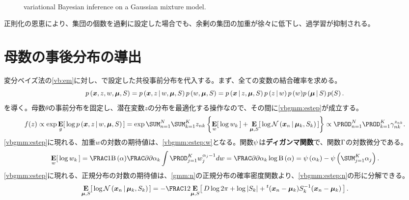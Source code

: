 \documentclass[10pt,a4paper]{book}
\begin{document}
\begin{figure}[h]
\centering
{}
\caption{variational Bayesian inference on a Gaussian mixture model.\label{fig:vb}}
\end{figure}

正則化の恩恵により、集団の個数を過剰に設定した場合でも、余剰の集団の加重が徐々に低下し、過学習が抑制される。

\section{母数の事後分布の導出}

変分ベイズ法の\eqref{vb:em}に対し、で設定した共役事前分布を代入する。まず、全ての変数の結合確率を求める。
%
\begin{equation}
\prob{\bm{x},z,w,\bm{\mu},S} =
\prob{\bm{x},z}[w,\bm{\mu},S] \prob{w,\bm{\mu},S} =
\prob{\bm{x}}[z,\bm{\mu},S] \prob{z}[w] \prob{w) \prob{\bm{\mu}}[S] p(S}.
\end{equation}
%
\Estep{}を導く。母数$\theta$の事前分布を固定し、潜在変数$z$の分布を最適化する操作なので、その間に\eqref{vbgmm:estep}が成立する。
%
\begin{equation}
\label{eq:vbgmm:estep}
f(z) \propto
\exp \E[g]{\log \prob{\bm{x},z}[w,\bm{\mu},S]} =
\exp \sum_{n=1}^N \sum_{k=1}^K z_{nk} \seq{\E[w]{\log w_k} + \E[\bm{\mu},S]{\log \Nd{\bm{x}_n}{\bm{\mu}_k,S_k}}} \propto
\prod_{n=1}^N \prod_{k=1}^K \gamma_{nk}^{z_{nk}}.
\end{equation}
%
\eqref{vbgmm:estep}に現れる、加重$w$の対数の期待値は、\eqref{vbgmm:estep:w}となる。関数$\psi$は\textbf{ディガンマ関数}で、関数$\Gamma$の対数微分である。
%
\begin{equation}
\label{eq:vbgmm:estep:w}
\E[w]{\log w_k} =
\frac{1}{\Bd{\alpha}} \pdiff{}{\alpha_k} \int \prod_{j=1}^K w_j^{\alpha_j-1} dw =
\pdiff{}{\alpha_k} \log \Bd{\alpha} =
\Pd{\alpha_k} - \Pd{\sum_{j=1}^K \alpha_j}.
\end{equation}
%
\eqref{vbgmm:estep}に現れる、正規分布の対数の期待値は、\eqref{gmm:n}の正規分布の確率密度関数より、\eqref{vbgmm:estep:n}の形に分解できる。
%
\begin{equation}
\label{eq:vbgmm:estep:n}
\E[\bm{\mu},S]{\log \Nd{\bm{x}_n}{\bm{\mu}_k,S_k}} =
- \frac{1}{2} \E[\bm{\mu},S]{D \log 2\pi + \log \abs{S_k} + \trans{(\bm{x}_n - \bm{\mu}_k)} S_k^{-1} (\bm{x}_n - \bm{\mu}_k)}.
\end{equation}
\end{document}
